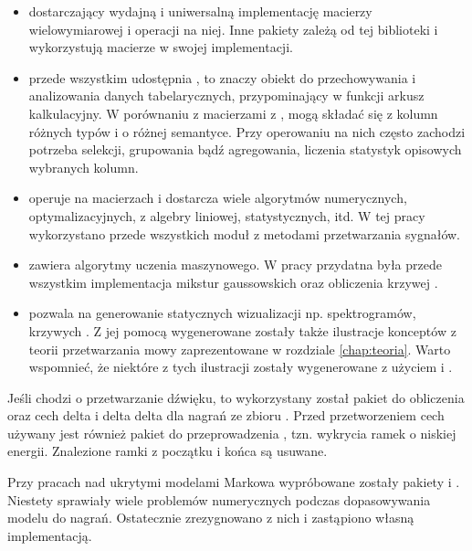 \begin{itemize}
    \item {} dostarczający wydajną i uniwersalną implementację macierzy wielowymiarowej i operacji na niej.
        Inne pakiety zależą od tej biblioteki i wykorzystują macierze w swojej implementacji.
    \item {} przede wszystkim udostępnia , to znaczy obiekt do przechowywania i analizowania danych tabelarycznych, przypominający w funkcji arkusz kalkulacyjny. W porównaniu z macierzami z ,  mogą składać się z kolumn różnych typów i o różnej semantyce. Przy operowaniu na nich często zachodzi potrzeba selekcji, grupowania bądź agregowania, liczenia statystyk opisowych wybranych kolumn.
    \item {} operuje na macierzach  i dostarcza wiele algorytmów numerycznych, optymalizacyjnych, z algebry liniowej, statystycznych, itd. W tej pracy wykorzystano przede wszystkich moduł z metodami przetwarzania sygnałów.
    \item {} zawiera algorytmy uczenia maszynowego. W pracy przydatna była przede wszystkim implementacja mikstur gaussowskich oraz obliczenia krzywej .
    \item {} pozwala na generowanie statycznych wizualizacji np. spektrogramów, krzywych . Z jej pomocą wygenerowane zostały także ilustracje konceptów z teorii przetwarzania mowy zaprezentowane w rozdziale \ref{chap:teoria}. Warto wspomnieć, że niektóre z tych ilustracji zostały wygenerowane z użyciem  i .
\end{itemize}

Jeśli chodzi o przetwarzanie dźwięku, to wykorzystany został pakiet 
do obliczenia  oraz cech delta i delta delta dla nagrań ze zbioru .
Przed przetworzeniem cech używany jest również pakiet  do przeprowadzenia
, tzn. wykrycia ramek o niskiej energii. Znalezione ramki z początku i końca są usuwane.

Przy pracach nad ukrytymi modelami Markowa wypróbowane zostały pakiety  i .
Niestety sprawiały wiele problemów numerycznych podczas dopasowywania modelu do nagrań. Ostatecznie zrezygnowano z nich
i zastąpiono własną implementacją.

